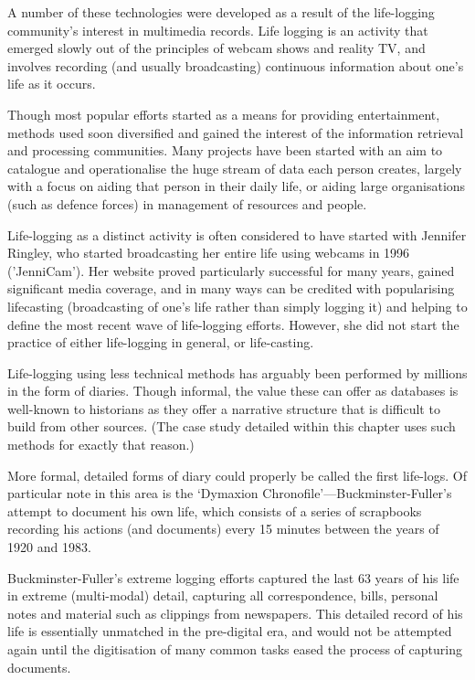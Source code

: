 A number of these technologies were developed as a result of the life-logging community's interest in multimedia records.  Life logging is an activity that emerged slowly out of the principles of webcam shows and reality TV, and involves recording (and usually broadcasting) continuous information about one's life as it occurs.

Though most popular efforts started as a means for providing entertainment, methods used soon diversified and gained the interest of the information retrieval and processing communities.  Many projects have been started with an aim to catalogue and operationalise the huge stream of data each person creates, largely with a focus on aiding that person in their daily life, or aiding large organisations (such as defence forces) in management of resources and people.





Life-logging as a distinct activity is often considered to have started with Jennifer Ringley, who started broadcasting her entire life using webcams in 1996 ('JenniCam').  Her website proved particularly successful for many years, gained significant media coverage, and in many ways can be credited with popularising lifecasting (broadcasting of one's life rather than simply logging it) and helping to define the most recent wave of life-logging efforts.  However, she did not start the practice of either life-logging in general, or life-casting.


Life-logging using less technical methods has arguably been performed by millions in the form of diaries.  Though informal, the value these can offer as databases is well-known to historians as they offer a narrative structure that is difficult to build from other sources.  (The case study detailed within this chapter uses such methods for exactly that reason.)


More formal, detailed forms of diary could properly be called the first life-logs.  Of particular note in this area is the `Dymaxion Chronofile'---Buckminster-Fuller's attempt to document his own life, which consists of a series of scrapbooks recording his actions (and documents) every 15 minutes between the years of 1920 and 1983.

Buckminster-Fuller's extreme logging efforts captured the last 63 years of his life in extreme (multi-modal) detail, capturing all correspondence, bills, personal notes and material such as clippings from newspapers.  This detailed record of his life is essentially unmatched in the pre-digital era, and would not be attempted again until the digitisation of many common tasks eased the process of capturing documents.


